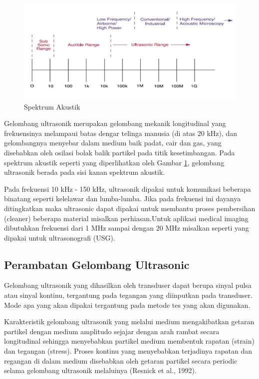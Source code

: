 \begin{figure}[h!]
	\centering
	\includegraphics[width=0.7\linewidth]{"gambar/spektrum akustik"}
	\caption{Spektrum Akustik}
	\label{fig:spektrum-akustik}
\end{figure}

Gelombang ultrasonik merupakan gelombang mekanik longitudinal yang frekuensinya melampaui batas dengar telinga manusia (di atas 20 kHz), dan gelombangnya menyebar dalam medium baik padat, cair dan gas, yang disebabkan oleh osilasi bolak balik partikel pada titik kesetimbangan. Pada spektrum akustik seperti yang diperlihatkan oleh Gambar \ref{fig:spektrum-akustik}, gelombang ultrasonik berada pada sisi kanan spektrum akustik.

Pada frekuensi 10 kHz - 150 kHz, ultrasonik dipakai untuk komunikasi beberapa binatang seperti kelelawar dan lumba-lumba. Jika pada frekuensi ini dayanya ditingkatkan maka ultrasonic dapat dipakai untuk membantu proses pembersihan (cleaner) beberapa material misalkan perhiasan.Untuk aplikasi medical imaging dibutuhkan frekuensi dari 1 MHz sampai dengan 20 MHz misalkan seperti yang dipakai untuk ultrasonografi (USG).

\subsection{Perambatan Gelombang Ultrasonic}

Gelombang ultrasonik yang dihasilkan oleh transduser dapat berupa sinyal pulsa atau sinyal kontinu, tergantung pada tegangan yang diinputkan pada transduser. Mode apa yang akan dipakai tergantung pada metode tes yang akan digunakan. 

Karakteristik gelombang ultrasonik yang melalui medium mengakibatkan getaran partikel dengan medium amplitudo sejajar dengan arah rambat secara longitudinal sehingga menyebabkan partikel medium membentuk rapatan (strain) dan tegangan (stress). Proses kontinu yang menyebabkan terjadinya rapatan dan regangan di dalam medium disebabkan oleh getaran partikel secara periodic selama gelombang ultrasonik melaluinya (Resnick et al., 1992).

